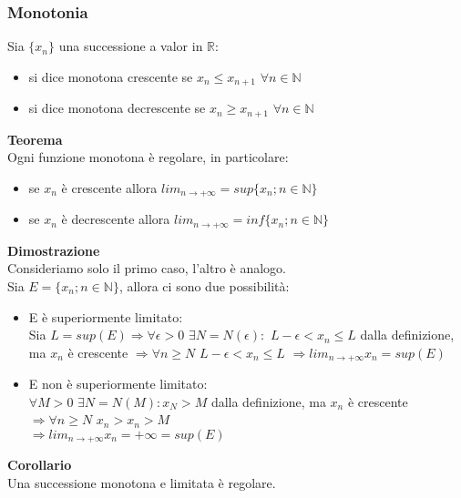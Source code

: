 \documentclass{article}
\begin{document}
\subsubsection{Monotonia}
Sia $\{x_n\}$ una successione a valor in $\mathds{R}$:\begin{itemize}
    \item si dice monotona crescente se $x_n\leq x_{n+1}$ $\forall n\in\mathds{N}$
    \item si dice monotona decrescente se $x_n\geq x_{n+1}$ $\forall n\in\mathds{N}$
\end{itemize}
\textbf{Teorema}\\
Ogni funzione monotona è regolare, in particolare:\begin{itemize}
    \item se $x_n$ è crescente allora $lim_{n\rightarrow+\infty}=sup\{x_n;n\in\mathds{N}\}$
    \item se $x_n$ è decrescente allora $lim_{n\rightarrow+\infty}=inf\{x_n;n\in\mathds{N}\}$
\end{itemize}
\textbf{Dimostrazione}\\
Consideriamo solo il primo caso, l'altro è analogo.\\
Sia $E=\{x_n;n\in\mathds{N}\}$, allora ci sono due possibilità:\begin{itemize}
    \item E è superiormente limitato:\\
    Sia $L=sup(E)\Rightarrow\forall\epsilon>0$ $\exists N=N(\epsilon):$ $L-\epsilon<x_n\leq L$ dalla definizione, ma $x_n$ è crescente $\Rightarrow\forall n\geq N$ $L-\epsilon<x_n\leq L$ $\Rightarrow lim_{n\rightarrow+\infty}x_n=sup(E)$
    \item E non è superiormente limitato:\\
    $\forall M>0$ $\exists N=N(M): x_N>M$ dalla definizione, ma $x_n$ è crescente $\Rightarrow\forall n\geq N$ $x_n>x_n>M$\\ $\Rightarrow lim_{n\rightarrow+\infty}x_n=+\infty=sup(E)$
\end{itemize}
\textbf{Corollario}\\
Una successione monotona e limitata è regolare.
\end{document}
